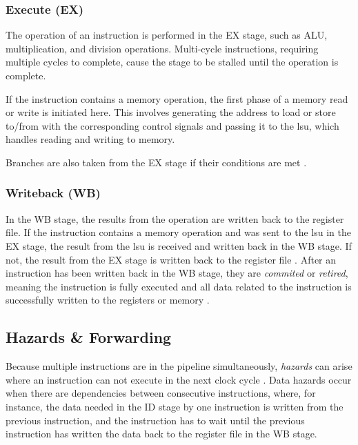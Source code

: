 \subsubsection{Execute (EX)}

The operation of an instruction is performed in the EX stage, such as ALU, multiplication, and division operations. Multi-cycle instructions, requiring multiple cycles to complete, cause the stage to be stalled until the operation is complete.

If the instruction contains a memory operation, the first phase of a memory read or write is initiated here. This involves generating the address to load or store to/from with the corresponding control signals and passing it to the \acrlong{lsu}, which handles reading and writing to memory.

Branches are also taken from the EX stage if their conditions are met \cite{openhwgroupPipelineDetailsCOREV2023}.

\subsubsection{Writeback (WB)}

In the WB stage, the results from the operation are written back to the register file. 
If the instruction contains a memory operation and was sent to the \acrshort{lsu} in the EX stage, the result from the \acrshort{lsu} is received and written back in the WB stage. If not, the result from the EX stage is written back to the register file \cite{openhwgroupPipelineDetailsCOREV2023}.
After an instruction has been written back in the WB stage, they are \textit{commited} or \textit{retired}, meaning the instruction is fully executed and all data related to the instruction is successfully written to the registers or memory \cite{taylorAdvancedRISCVVerification2023}. 


\subsection{Hazards \& Forwarding}

Because multiple instructions are in the pipeline simultaneously, \textit{hazards} can arise where an instruction can not execute in the next clock cycle \cite{pattersonComputerOrganizationDesign2021}. Data hazards occur when there are dependencies between consecutive instructions, where, for instance, the data needed in the ID stage by one instruction is written from the previous instruction, and the instruction has to wait until the previous instruction has written the data back to the register file in the WB stage.

